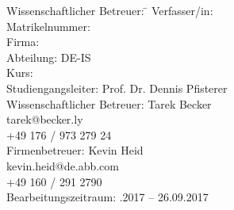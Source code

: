 \begin{titlepage}
\begin{center}
\begin{minipage}{\textwidth}
\begin{tabbing}
	Wissenschaftlicher Betreuer: \hspace{0.85cm}\=\kill
	Verfasser/in: \> \DerAutorDerArbeit \\[1.5mm]
	Matrikelnummer:  \\[1.5mm]
	Firma: \> \DerNameDerFirma  \\[1.5mm]
	Abteilung: \> DE-IS \\[1.5mm]
	Kurs: \> \DieKursbezeichnung \\[1.5mm]
	Studiengangsleiter: \> Prof. Dr. Dennis Pfisterer  \\[1.5mm]
	Wissenschaftlicher Betreuer: \> Tarek Becker \\
	\> tarek@becker.ly \\
	\> +49 176 / 973 279 24 \\[1.5mm]
	Firmenbetreuer: \> Kevin Heid \\
	\> kevin.heid@de.abb.com \\
	\> +49 160 / 291 2790 \\[1.5mm]
	Bearbeitungszeitraum: .2017 -- 26.09.2017
\end{tabbing}
\end{minipage}

\end{center}

\end{titlepage}